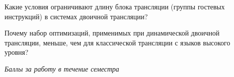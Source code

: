 \documentclass[a4paper, addpoints]{exam}
\begin{document}
\begin{questions}
\question[2] Какие условия ограничивают длину блока трансляции (группы гостевых инструкций) в системах двоичной трансляции?
\begin{solution}[2cm]
\end{solution}

\question[2] Почему набор оптимизаций, применимых при динамической двоичной трансляции, меньше, чем для классической трансляции с языков высокого уровня?
\begin{solution}[2cm]
\end{solution}

\bonusquestion \textit{Баллы за работу в течение семестра}

\newpage
\phantom{Blank page}

\end{questions}
\end{document}
